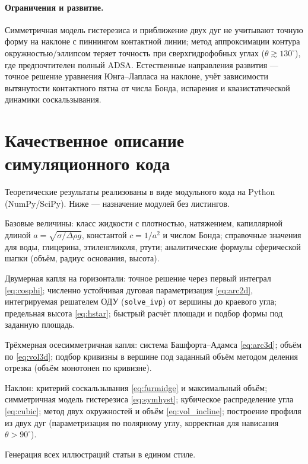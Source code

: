 \documentclass[11pt]{article}
\theoremstyle{definition}
\begin{document}
\paragraph{Ограничения и развитие.} Симметричная модель гистерезиса и приближение
двух дуг не учитывают точную форму на наклоне с пиннингом контактной линии; метод
аппроксимации контура окружностью/эллипсом теряет точность при сверхгидрофобных
углах ($\theta\gtrsim 130^{\circ}$), где предпочтителен полный ADSA. Естественные
направления развития --- точное решение уравнения Юнга--Лапласа на наклоне,
учёт зависимости вытянутости контактного пятна от числа Бонда, испарения и
квазистатической динамики соскальзывания.

\appendix
\section{Качественное описание симуляционного кода}
\label{app:sim}
Теоретические результаты реализованы в виде модульного кода на Python
(NumPy/SciPy). Ниже --- назначение модулей без листингов.

\begin{description}[leftmargin=1.3em,style=nextline]
\item[\texttt{physics}] Базовые величины: класс жидкости с плотностью, натяжением,
капиллярной длиной $a=\sqrt{\sigma/\Delta\rho g}$, константой $c=1/a^{2}$ и числом
Бонда; справочные значения для воды, глицерина, этиленгликоля, ртути; аналитические
формулы сферической шапки (объём, радиус основания, высота).
\item[\texttt{drop\_2d}] Двумерная капля на горизонтали: точное решение через
первый интеграл \eqref{eq:cosphi}; численно устойчивая дуговая параметризация
\eqref{eq:arc2d}, интегрируемая решателем ОДУ (\texttt{solve\_ivp}) от вершины до
краевого угла; предельная высота \eqref{eq:hstar}; быстрый расчёт площади и подбор
формы под заданную площадь.
\item[\texttt{drop\_axisym}] Трёхмерная осесимметричная капля: система
Башфорта--Адамса \eqref{eq:arc3d}; объём по \eqref{eq:vol3d}; подбор кривизны в
вершине под заданный объём методом деления отрезка (объём монотонен по кривизне).
\item[\texttt{inclined}] Наклон: критерий соскальзывания \eqref{eq:furmidge} и
максимальный объём; симметричная модель гистерезиса \eqref{eq:symhyst}; кубическое
распределение угла \eqref{eq:cubic}; метод двух окружностей и объём
\eqref{eq:vol_incline}; построение профиля из двух дуг (параметризация по полярному
углу, корректная для нависания $\theta>90^{\circ}$).
\item[\texttt{figures}] Генерация всех иллюстраций статьи в едином стиле.
\end{description}
\end{document}
